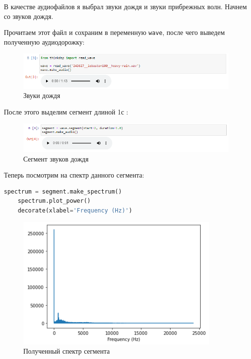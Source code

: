 \documentclass[a4paper]{article}
\begin{document}
            В качестве аудиофайлов я выбрал звуки дождя и звуки прибрежных волн. Начнем со звуков дождя.
            
            Прочитаем этот файл и сохраним в переменную \texttt{wave}, после чего выведем полученную аудиодорожку:
            
            \begin{figure}[H]
                \centering
                \includegraphics[width=\textwidth]{ex_1_rain_audio.png}
                \caption{Звуки дождя}
                \label{fig:ex_1_rain_audio}
            \end{figure}
            
            После этого выделим сегмент длиной 1с :
            
            \begin{figure}[H]
                \centering
                \includegraphics[width=\textwidth]{ex_1_rain_segment_audio.png}
                \caption{Сегмент звуков дождя}
                \label{fig:ex_1_rain_segment_audio}
            \end{figure}
            
            Теперь посмотрим на спектр данного сегмента:
            
\begin{lstlisting}[language=Python, caption= Получение спектра сегмента]
    spectrum = segment.make_spectrum()
    spectrum.plot_power()
    decorate(xlabel='Frequency (Hz)')
\end{lstlisting}               
            
            \begin{figure}[H]
                \centering
                \includegraphics{ex_1_rain_spectr.png}
                \caption{Полученный спектр сегмента}
                \label{fig:ex_1_rain_spectr}
            \end{figure}
            
\end{document}
